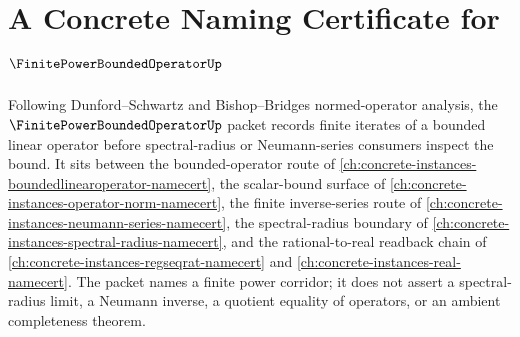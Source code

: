 \chapter{A Concrete Naming Certificate for $\FinitePowerBoundedOperatorUp$}
\label{ch:concrete-instances-finite-power-bounded-operator-namecert}

Following Dunford--Schwartz and Bishop--Bridges normed-operator analysis, the $\FinitePowerBoundedOperatorUp$ packet records finite iterates of a bounded linear operator before spectral-radius or Neumann-series consumers inspect the bound. It sits between the bounded-operator route of \autoref{ch:concrete-instances-boundedlinearoperator-namecert}, the scalar-bound surface of \autoref{ch:concrete-instances-operator-norm-namecert}, the finite inverse-series route of \autoref{ch:concrete-instances-neumann-series-namecert}, the spectral-radius boundary of \autoref{ch:concrete-instances-spectral-radius-namecert}, and the rational-to-real readback chain of \autoref{ch:concrete-instances-regseqrat-namecert} and \autoref{ch:concrete-instances-real-namecert}. The packet names a finite power corridor; it does not assert a spectral-radius limit, a Neumann inverse, a quotient equality of operators, or an ambient completeness theorem.

